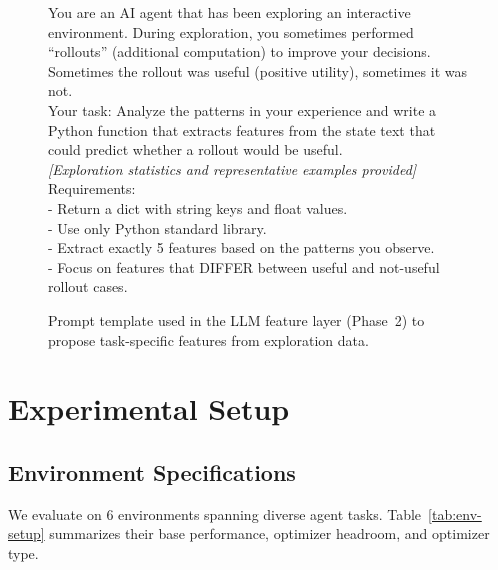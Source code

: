 \begin{figure}[h]
  \centering
  \begin{tcolorbox}[
      title=\textbf{LLM Feature Layer Prompt Template},
      colframe=PTGreenDark,
      colback=PTLightGreen,
      colbacktitle=PTGreenDark,
      coltitle=white,
      fonttitle=\bfseries,
      boxrule=0.9pt,
      arc=0pt,
      left=7pt,right=7pt,top=7pt,bottom=7pt,
      width=\columnwidth,
      enhanced
    ]
    \ttfamily\footnotesize
    You are an AI agent that has been exploring an interactive environment. During exploration, you sometimes performed ``rollouts'' (additional computation) to improve your decisions. Sometimes the rollout was useful (positive utility), sometimes it was not.\\[0.6ex]
    Your task: Analyze the patterns in your experience and write a Python function that extracts features from the state text that could predict whether a rollout would be useful.\\[0.6ex]
    \textnormal{\textit{[Exploration statistics and representative examples provided]}}\\[0.6ex]
    Requirements:\\
    - Return a dict with string keys and float values.\\
    - Use only Python standard library.\\
    - Extract exactly 5 features based on the patterns you observe.\\
    - Focus on features that DIFFER between useful and not-useful rollout cases.
  \end{tcolorbox}
  \caption{Prompt template used in the LLM feature layer (Phase~2) to propose task-specific features from exploration data.}
  \label{fig:llm-prompt-template}
\end{figure}

\section{Experimental Setup}
\label{app:experiments}

\subsection{Environment Specifications}
\label{app:environment}

We evaluate on 6 environments spanning diverse agent tasks.
Table~\ref{tab:env-setup} summarizes their base performance,
optimizer headroom, and optimizer type.

